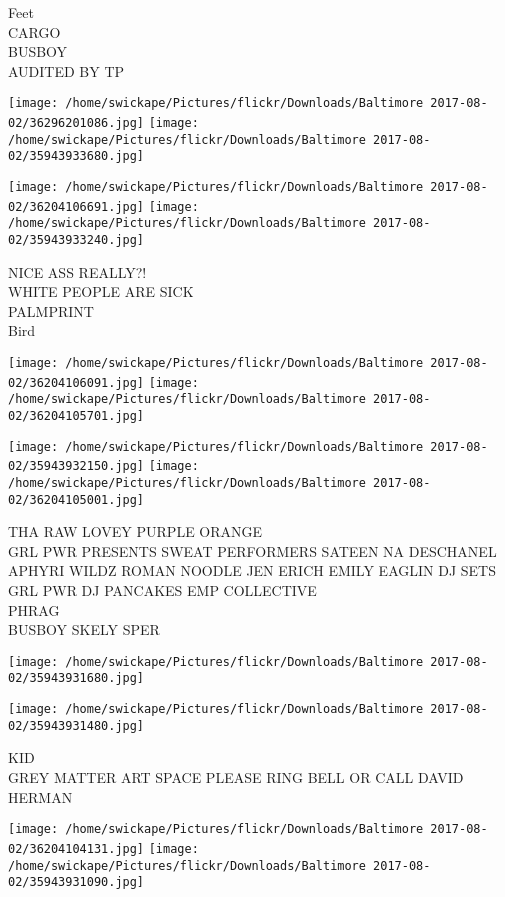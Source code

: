 \documentclass[10pt,letterpaper]{article}
\begin{document}
Feet\\
CARGO\\
BUSBOY\\
AUDITED BY TP
\pagebreak

\texttt{[image: /home/swickape/Pictures/flickr/Downloads/Baltimore 2017-08-02/36296201086.jpg]}
\texttt{[image: /home/swickape/Pictures/flickr/Downloads/Baltimore 2017-08-02/35943933680.jpg]}

\texttt{[image: /home/swickape/Pictures/flickr/Downloads/Baltimore 2017-08-02/36204106691.jpg]}
\texttt{[image: /home/swickape/Pictures/flickr/Downloads/Baltimore 2017-08-02/35943933240.jpg]}

NICE ASS REALLY?!\\
WHITE PEOPLE ARE SICK\\
PALMPRINT\\
Bird
\pagebreak

\texttt{[image: /home/swickape/Pictures/flickr/Downloads/Baltimore 2017-08-02/36204106091.jpg]}
\texttt{[image: /home/swickape/Pictures/flickr/Downloads/Baltimore 2017-08-02/36204105701.jpg]}

\texttt{[image: /home/swickape/Pictures/flickr/Downloads/Baltimore 2017-08-02/35943932150.jpg]}
\texttt{[image: /home/swickape/Pictures/flickr/Downloads/Baltimore 2017-08-02/36204105001.jpg]}

THA RAW LOVEY PURPLE ORANGE\\
GRL PWR PRESENTS SWEAT PERFORMERS SATEEN  NA DESCHANEL APHYRI WILDZ ROMAN NOODLE JEN ERICH EMILY EAGLIN DJ SETS GRL PWR DJ PANCAKES EMP COLLECTIVE\\
PHRAG\\
BUSBOY SKELY SPER
\pagebreak

\texttt{[image: /home/swickape/Pictures/flickr/Downloads/Baltimore 2017-08-02/35943931680.jpg]}

\vspace{0.25in}
\texttt{[image: /home/swickape/Pictures/flickr/Downloads/Baltimore 2017-08-02/35943931480.jpg]}

KID\\
GREY MATTER ART SPACE PLEASE RING BELL OR CALL DAVID HERMAN
\pagebreak

\texttt{[image: /home/swickape/Pictures/flickr/Downloads/Baltimore 2017-08-02/36204104131.jpg]}
\texttt{[image: /home/swickape/Pictures/flickr/Downloads/Baltimore 2017-08-02/35943931090.jpg]}
\end{document}
